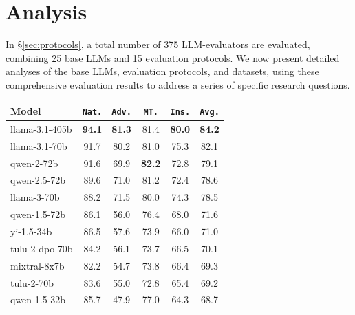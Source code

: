 \documentclass[11pt]{article}
\newcommand{\natshort}{\texttt{Nat.}\xspace}
\newcommand{\advshort}{\texttt{Adv.}\xspace}
\newcommand{\mtshort}{\texttt{MT.}\xspace}
\newcommand{\insshort}{\texttt{Ins.}\xspace}
\begin{document}
\section{Analysis}
\label{sec:analysis}

In \S\ref{sec:protocols}, a total number of 375 LLM-evaluators are evaluated, combining 25 base LLMs and 15 evaluation protocols. 
We now present detailed analyses of the base LLMs, evaluation protocols, and datasets, using these comprehensive evaluation results to address a series of specific research questions.

\begin{table}[t!]
\small
\centering
\addtolength{\tabcolsep}{+1pt} 
\begin{tabular}{@{}lccccc@{}}
\toprule
\textbf{Model} & \textbf{\natshort} & \textbf{\advshort} & \textbf{\mtshort}  & \textbf{\insshort} & \textbf{\texttt{Avg.}}\\
\midrule
 llama-3.1-405b  & \textbf{94.1}    & \textbf{81.3}        & 81.4          & \textbf{80.0}   & \textbf{84.2} \\
 llama-3.1-70b   & 91.7             & 80.2                 & 81.0          & 75.3            & 82.1          \\
 qwen-2-72b      & 91.6             & 69.9                 & \textbf{82.2} & 72.8            & 79.1          \\
 qwen-2.5-72b    & 89.6             & 71.0                 & 81.2          & 72.4            & 78.6          \\
 llama-3-70b     & 88.2             & 71.5                 & 80.0          & 74.3            & 78.5          \\
 qwen-1.5-72b    & 86.1             & 56.0                 & 76.4          & 68.0            & 71.6          \\
 yi-1.5-34b      & 86.5             & 57.6                 & 73.9          & 66.0            & 71.0          \\
 tulu-2-dpo-70b  & 84.2             & 56.1                 & 73.7          & 66.5            & 70.1          \\
 mixtral-8x7b    & 82.2             & 54.7                 & 73.8          & 66.4            & 69.3          \\
 tulu-2-70b      & 83.6             & 55.0                 & 72.8          & 65.4            & 69.2          \\
 qwen-1.5-32b    & 85.7             & 47.9                 & 77.0          & 64.3            & 68.7          \\

\end{tabular}
\end{table}
\end{document}
